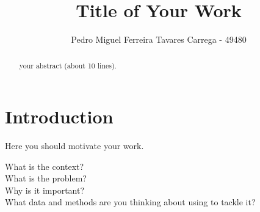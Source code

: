 \documentclass[sigplan]{acmart}
\begin{document}
\title{Title of Your Work}


\author{Pedro Miguel Ferreira Tavares Carrega - 49480}


\renewcommand{\shortauthors}{Pedro Miguel Ferreira Tavares Carrega - 49480}

\begin{abstract}
  your abstract (about 10 lines).
\end{abstract}




\maketitle

\section{Introduction}

Here you should motivate your work. 

What is the context? \\

What is the problem? \\

Why is it important? \\

What data and methods are you thinking about using to tackle it? \\
\end{document}
